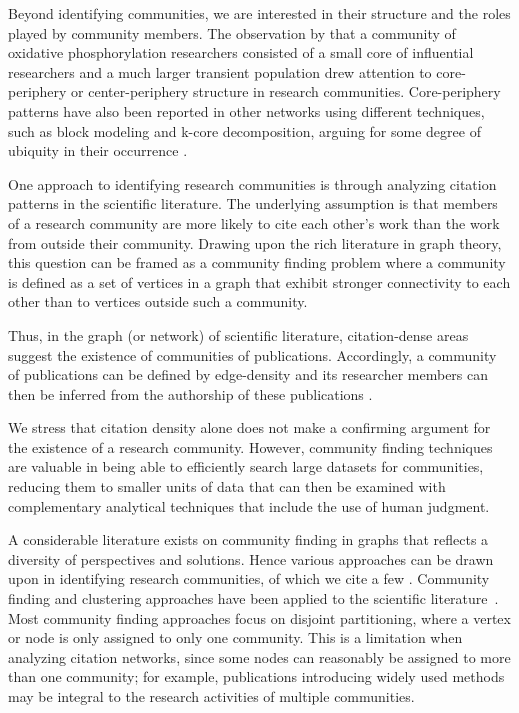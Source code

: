 \documentclass[12pt, oneside]{article}   	%
\begin{document}
Beyond identifying communities, we are interested in their structure and the roles played by community members.  The observation by \cite{Price1966} that a community of oxidative phosphorylation researchers consisted of a small core of influential researchers and a much larger transient population drew attention to core-periphery or center-periphery structure in research communities. Core-periphery patterns have also been reported in other networks using different techniques, such as block modeling and k-core decomposition, arguing for some degree of ubiquity in their occurrence \citep{borgatti2000models,Breiger2014,Rombach2017,gallagher2021clarified,yanchenko_2202.04455}. 
	
		
One approach to identifying research communities is through analyzing citation patterns in the scientific literature. The underlying assumption is that members of a research community are more likely to cite each other's work than the work from outside their community. Drawing upon the rich literature in graph theory, this question can be framed as a community finding problem where a community is defined as a set of vertices in a graph that exhibit stronger connectivity to each other than to vertices outside such a community. 

Thus, in the graph (or network) of scientific literature, citation-dense areas suggest the existence of communities of publications. Accordingly, a community of publications can be defined by edge-density and 
its researcher members can then be inferred from the authorship of these publications \citep{Chandrasekharan2021,Wedell2022}. 
	
We stress that citation density alone does not make a confirming argument for the existence of a research community. However, community finding techniques are valuable in being able to efficiently search large datasets for communities, reducing them to smaller units of data that can then be examined with complementary analytical techniques that include the use of human judgment. 
	
A considerable literature exists on community finding in graphs that reflects a diversity of perspectives and solutions. Hence various approaches can be drawn upon in identifying research communities, of which we cite a few \citep{Fortunato2009,FORTUNATO201075,Coscia2011,Yang2016}.  Community finding and clustering approaches have been applied to the scientific literature~\citep{Newman2006,Fortunato2009,Boyack2010,Boyack2019,Traag2019,Ahlgren2020,Chandrasekharan2021,Wedell2022}. Most community finding approaches focus on disjoint partitioning, where a vertex or node is only assigned to only one community.   
This is a limitation when analyzing citation networks, since some nodes can reasonably be assigned to more than one community; for example, publications introducing widely used methods may be integral to the research activities of multiple communities. 
\end{document}
